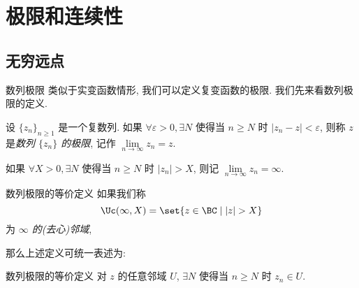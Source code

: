 \section{极限和连续性}


\subsection{无穷远点}
\begin{frame}{数列极限}
	\onslide<+->
	类似于实变函数情形, 我们可以定义复变函数的极限.
	\onslide<+->
	我们先来看数列极限的定义.
	\onslide<+->
	\begin{definition}
		设 $\{z_n\}_{n\ge 1}$ 是一个复数列.
		如果 $\forall \varepsilon>0,\exists N$ 使得当 $n\ge N$ 时 $|z_n-z|<\varepsilon$, 则称 $z$ 是\emph{数列 $\{z_n\}$ 的极限}, 记作 \emph{$\lim\limits_{n\to\infty}z_n=z$}.
	\end{definition}
	\onslide<+->
	如果 $\forall X>0,\exists N$ 使得当 $n\ge N$ 时 $|z_n|>X$, 则记 $\lim\limits_{n\to\infty}z_n=\infty$.
\end{frame}


\begin{frame}{数列极限的等价定义}
	\onslide<+->
	如果我们称
	\[\Uc(\infty,X)=\set{z\in\BC\mid|z|>X}
	\]
	为 \emph{$\infty$ 的(去心)邻域},
	\onslide<+->
	\begin{center}
	\end{center}
	\onslide<+->
	那么上述定义可统一表述为:

	\onslide<+->
	\begin{third}{数列极限的等价定义}
		对 $z$ 的任意邻域 $U$, $\exists N$ 使得当 $n\ge N$ 时 $z_n\in U$.
	\end{third}
\end{frame}


